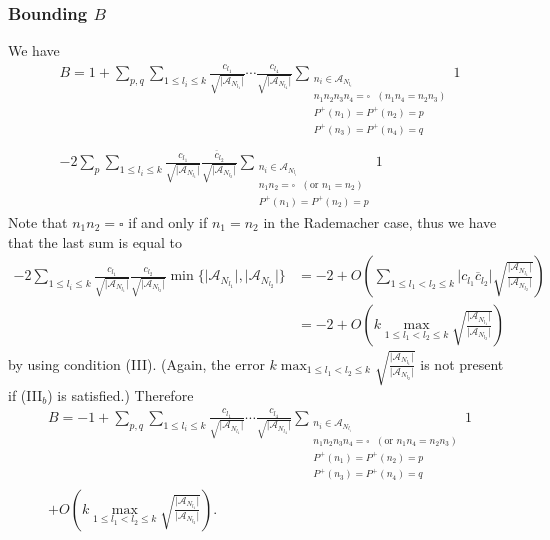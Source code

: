 \documentclass[11pt]{tran-l}
\theoremstyle{definition}
\theoremstyle{remark}
\numberwithin{equation}{section}
\begin{document}
\subsubsection{Bounding $B$} We have 
\begin{multline*}
    B = 1+ \sum_{p, q} \sum_{1\leq l_i\leq k} \frac{c_{l_1}}{\sqrt{\lvert \mathcal A_{N_{l_1}}\rvert}}\cdots \frac{c_{l_4}}{\sqrt{\lvert \mathcal A_{N_{l_4}}\rvert}}\sum_{\substack{n_i\in\mathcal A_{N_{l_i}} \\ n_1n_2n_3n_4 = \square \text{ }(n_1n_4=n_2n_3) \\ P^+(n_1) = P^+(n_2)=p \\ P^+(n_3) = P^+(n_4) =q}} 1  \\ \\ - 2\sum_p\sum_{1\leq l_i\leq k} \frac{c_{l_1}}{\sqrt{\lvert \mathcal A_{N_{l_1}}\rvert}}\frac{\overline{c}_{l_2}}{\sqrt{\lvert \mathcal A_{N_{l_2}}\rvert}}\sum_{\substack{n_i\in\mathcal A_{N_{l_i}} \\ n_1n_2=\square\text{ }(\text{or }n_1=n_2) \\ P^+(n_1) = P^+(n_2) = p}} 1 \label{Beq}
\end{multline*}
Note that $n_1n_2=\square$ if and only if $n_1=n_2$ in the Rademacher case, thus we have that the last sum is equal to \begin{align*}
    -2\sum_{1\leq l_i\leq k} \frac{c_{l_1}}{\sqrt{\lvert \mathcal A_{N_{l_1}}\rvert}}\frac{c_{l_2}}{\sqrt{\lvert \mathcal A_{N_{l_2}}\rvert}} \min\{\lvert \mathcal A_{N_{l_1}}\rvert, \lvert \mathcal A_{N_{l_2}}\rvert \} 
     & = -2  + O\left( \sum_{1\leq l_1 < l_2\leq k} \lvert c_{l_1}\overline{c}_{l_2}\rvert\sqrt{\frac{\lvert \mathcal A_{N_{l_1}}\rvert}{\lvert \mathcal A_{N_{l_2}}\rvert}}\right)  
      \\ & = -2 + O\left(k\max_{1\leq l_1<l_2\leq k} \sqrt{\frac{\lvert \mathcal A_{N_{l_1}}\rvert}{\lvert \mathcal A_{N_{l_2}}\rvert}}\right)
\end{align*} by using condition (III). (Again, the error $k\max_{1\leq l_1<l_2\leq k} \sqrt{\frac{\lvert \mathcal A_{N_{l_1}}\rvert}{\lvert \mathcal A_{N_{l_2}}\rvert}}$ is not present if (III$_b$) is satisfied.) Therefore 
\begin{multline*}
    B = -1+ \sum_{p, q} \sum_{1\leq l_i\leq k} \frac{c_{l_1}}{\sqrt{\lvert \mathcal A_{N_{l_1}}\rvert}}\cdots \frac{{c}_{l_4}}{\sqrt{\lvert \mathcal A_{N_{l_4}}\rvert}}\sum_{\substack{n_i\in\mathcal A_{N_{l_i}} \\ n_1n_2n_3n_4 = \square \text{ }(\text{or }n_1n_4=n_2n_3)\\ P^+(n_1) = P^+(n_2)=p \\ P^+(n_3) = P^+(n_4) =q}} 1 \\ +  O\left(k\max_{1\leq l_1<l_2\leq k} \sqrt{\frac{\lvert \mathcal A_{N_{l_1}}\rvert}{\lvert \mathcal A_{N_{l_2}}\rvert}}\right).
\end{multline*}
\end{document}
